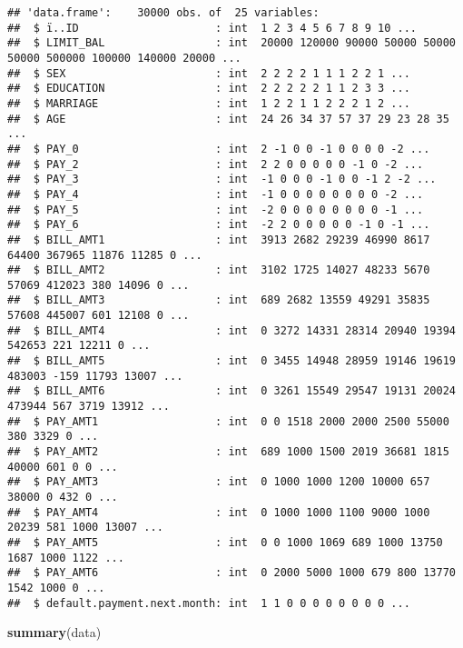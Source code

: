 \documentclass[]{article}
\newenvironment{Shaded}{\begin{snugshade}}{\end{snugshade}}
\newcommand{\KeywordTok}[1]{\textcolor[rgb]{0.13,0.29,0.53}{\textbf{#1}}}
\newcommand{\NormalTok}[1]{#1}
\begin{document}
\begin{verbatim}
## 'data.frame':    30000 obs. of  25 variables:
##  $ ï..ID                     : int  1 2 3 4 5 6 7 8 9 10 ...
##  $ LIMIT_BAL                 : int  20000 120000 90000 50000 50000 50000 500000 100000 140000 20000 ...
##  $ SEX                       : int  2 2 2 2 1 1 1 2 2 1 ...
##  $ EDUCATION                 : int  2 2 2 2 2 1 1 2 3 3 ...
##  $ MARRIAGE                  : int  1 2 2 1 1 2 2 2 1 2 ...
##  $ AGE                       : int  24 26 34 37 57 37 29 23 28 35 ...
##  $ PAY_0                     : int  2 -1 0 0 -1 0 0 0 0 -2 ...
##  $ PAY_2                     : int  2 2 0 0 0 0 0 -1 0 -2 ...
##  $ PAY_3                     : int  -1 0 0 0 -1 0 0 -1 2 -2 ...
##  $ PAY_4                     : int  -1 0 0 0 0 0 0 0 0 -2 ...
##  $ PAY_5                     : int  -2 0 0 0 0 0 0 0 0 -1 ...
##  $ PAY_6                     : int  -2 2 0 0 0 0 0 -1 0 -1 ...
##  $ BILL_AMT1                 : int  3913 2682 29239 46990 8617 64400 367965 11876 11285 0 ...
##  $ BILL_AMT2                 : int  3102 1725 14027 48233 5670 57069 412023 380 14096 0 ...
##  $ BILL_AMT3                 : int  689 2682 13559 49291 35835 57608 445007 601 12108 0 ...
##  $ BILL_AMT4                 : int  0 3272 14331 28314 20940 19394 542653 221 12211 0 ...
##  $ BILL_AMT5                 : int  0 3455 14948 28959 19146 19619 483003 -159 11793 13007 ...
##  $ BILL_AMT6                 : int  0 3261 15549 29547 19131 20024 473944 567 3719 13912 ...
##  $ PAY_AMT1                  : int  0 0 1518 2000 2000 2500 55000 380 3329 0 ...
##  $ PAY_AMT2                  : int  689 1000 1500 2019 36681 1815 40000 601 0 0 ...
##  $ PAY_AMT3                  : int  0 1000 1000 1200 10000 657 38000 0 432 0 ...
##  $ PAY_AMT4                  : int  0 1000 1000 1100 9000 1000 20239 581 1000 13007 ...
##  $ PAY_AMT5                  : int  0 0 1000 1069 689 1000 13750 1687 1000 1122 ...
##  $ PAY_AMT6                  : int  0 2000 5000 1000 679 800 13770 1542 1000 0 ...
##  $ default.payment.next.month: int  1 1 0 0 0 0 0 0 0 0 ...
\end{verbatim}

\begin{Shaded}
\begin{Highlighting}[]
\KeywordTok{summary}\NormalTok{(data)}
\end{Highlighting}
\end{Shaded}
\end{document}
